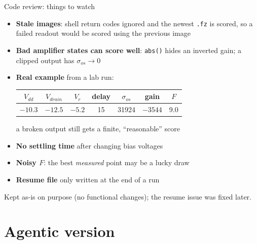 \documentclass[aspectratio=169,10pt]{beamer}
\begin{document}
\begin{frame}{Code review: things to watch}
  \begin{itemize}
    \item \textbf{Stale images}: shell return codes ignored and the newest
          \texttt{.fz} is scored, so a failed readout would be scored using
          the previous image
    \item \textbf{Bad amplifier states can score well}: \texttt{abs()} hides
          an inverted gain; a clipped output has $\sigma_{os}\to 0$
    \item \textbf{Real example} from a lab run:
          \begin{center}\small
          \begin{tabular}{cccc|ccc}
            $V_{dd}$ & $V_{drain}$ & $V_r$ & delay & $\sigma_{os}$ & gain & $F$\\\midrule
            $-10.3$ & $-12.5$ & $-5.2$ & 15 & 31924 & $-3544$ & 9.0
          \end{tabular}\end{center}
          a broken output still gets a finite, ``reasonable'' score
    \item \textbf{No settling time} after changing bias voltages
    \item \textbf{Noisy $F$}: the best \emph{measured} point may be a lucky draw
    \item \textbf{Resume file} only written at the end of a run
  \end{itemize}
  \vspace{1mm}
  {\scriptsize Kept as-is on purpose (no functional changes); the resume issue was fixed later.}
\end{frame}

\section{Agentic version}
\end{document}
